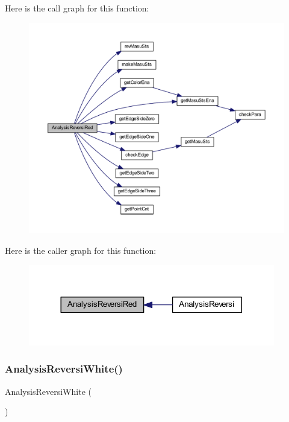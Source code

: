 Here is the call graph for this function\+:\nopagebreak
\begin{figure}[H]
\begin{center}
\leavevmode
\includegraphics[width=350pt]{class_reversi_ad44cfa7c45a98365df2d6db094d61901_cgraph}
\end{center}
\end{figure}
Here is the caller graph for this function\+:\nopagebreak
\begin{figure}[H]
\begin{center}
\leavevmode
\includegraphics[width=305pt]{class_reversi_ad44cfa7c45a98365df2d6db094d61901_icgraph}
\end{center}
\end{figure}
\mbox{\label{class_reversi_a3c30afb2509b0782b1c22a8770c68c48}} 
\subsubsection{\texorpdfstring{Analysis\+Reversi\+White()}{AnalysisReversiWhite()}}
{\footnotesize\ttfamily Analysis\+Reversi\+White (\begin{DoxyParamCaption}{ }\end{DoxyParamCaption})\hspace{0.3cm}{\ttfamily [private]}}



